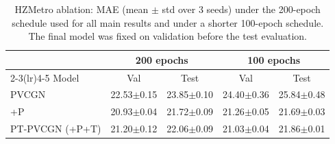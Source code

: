 \begin{table}[t]
\centering
\caption{HZMetro ablation: MAE (mean $\pm$ std over 3 seeds) under the 200-epoch schedule used for all main results and under a shorter 100-epoch schedule. The final model was fixed on validation before the test evaluation.}
\label{tab:ablation}
\footnotesize
\begin{tabular}{lcccc}
\toprule
 & \multicolumn{2}{c}{200 epochs} & \multicolumn{2}{c}{100 epochs} \\
\cmidrule(lr){2-3}\cmidrule(lr){4-5}
Model & Val & Test & Val & Test \\
\midrule
PVCGN & 22.53\tiny{$\pm$0.15} & 23.85\tiny{$\pm$0.10} & 24.40\tiny{$\pm$0.36} & 25.84\tiny{$\pm$0.48} \\
+P & 20.93\tiny{$\pm$0.04} & 21.72\tiny{$\pm$0.09} & 21.26\tiny{$\pm$0.05} & 21.69\tiny{$\pm$0.03} \\
PT-PVCGN (+P+T) & 21.20\tiny{$\pm$0.12} & 22.06\tiny{$\pm$0.09} & 21.03\tiny{$\pm$0.04} & 21.86\tiny{$\pm$0.01} \\
\bottomrule
\end{tabular}
\end{table}